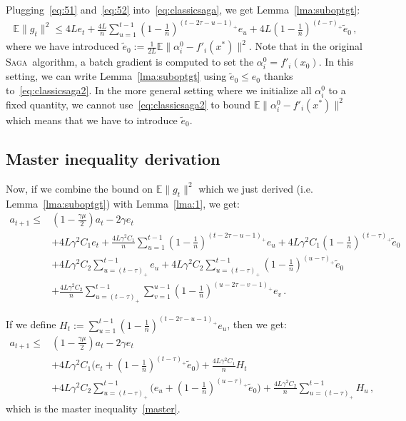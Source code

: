 \documentclass[twoside]{article}
\newcommand{\stepsize}{\gamma}
\newcommand{\strongconvex}{\mu}
\newcommand{\overlap}{\tau}
\newcommand{\lipschitz}{L}
\newcommand{\E}{\mathbb{E}}
\newcommand{\SAGA}{\textsc{Saga}}
\begin{document}
Plugging~\eqref{eq:51} and~\eqref{eq:52} into~\eqref{eq:classicsaga}, we get Lemma~\ref{lma:suboptgt}:
\begin{align}\label{eq:53}
\E\|g_t\|^2
\leq 4\lipschitz e_t 
	+ \frac{4\lipschitz}{n} \sum_{u=1}^{t-1} (1 - \frac{1}{n})^{(t-2\overlap-u -1)_+} e_u 
	+ 4\lipschitz (1 - \frac{1}{n})^{(t-\overlap)_+} \tilde e_0 \,  ,
\end{align}
where we have introduced $\tilde e_0 := \frac{1}{2\lipschitz} \E\|\alpha_i^0 - f'_i(x^*)\|^2$.
Note that in the original \SAGA\ algorithm, a batch gradient is computed to set the $\alpha_i^0 = f'_i(x_0)$. 
In this setting, we can write Lemma~\ref{lma:suboptgt} using $\tilde e_0 \leq e_0$ thanks to~\eqref{eq:classicsaga2}.
In the more general setting where we initialize all $\alpha_i^0$ to a fixed quantity, we cannot use~\eqref{eq:classicsaga2} to bound $\E\|\alpha_i^0 - f'_i(x^*)\|^2$ which means that we have to introduce $\tilde e_0$.

\subsection{Master inequality derivation}\label{apxB:master}
Now, if we combine the bound on $\E\|g_{t}\|^2$ which we just derived (i.e. Lemma~\ref{lma:suboptgt}) with Lemma~\ref{lma:1}, we get:
\begin{equation}
\begin{aligned}
a_{t+1} 
\leq &(1 - \frac{\stepsize\strongconvex}{2}) a_t 
	- 2\stepsize e_t
\\
	&+ 4\lipschitz\stepsize^2 C_1e_t 
	+ \frac{4\lipschitz\stepsize^2 C_1}{n} \sum_{u=1}^{t-1} (1 - \frac{1}{n})^{(t-2\overlap-u -1)_+} e_u
	+ 4\lipschitz \stepsize^2 C_1(1 - \frac{1}{n})^{(t-\overlap)_+} \tilde e_0
\\
	&+4\lipschitz\stepsize^2 C_2\sum_{u=(t-\overlap)_+}^{t-1} e_u 
	+4\lipschitz\stepsize^2 C_2 \sum_{u=(t-\overlap)_+}^{t-1} (1 - \frac{1}{n})^{(u - \overlap)_+} \tilde e_0
\\
	&+ \frac{4\lipschitz\stepsize^2 C_2}{n} \sum_{u=(t-\overlap)_+}^{t-1} \sum_{v=1}^{u-1} (1-\frac{1}{n})^{(u - 2\overlap - v -1)_+}e_v  \, .
\end{aligned}
\end{equation}

If we define $H_t := \sum_{u=1}^{t-1} (1 - \frac{1}{n})^{(t-2\overlap-u-1)_+} e_u$, then we get:
\begin{equation}\label{eq:master}
\begin{aligned} 
a_{t+1} 
\leq &(1 - \frac{\stepsize\strongconvex}{2}) a_t 
	- 2\stepsize e_t
\\
	&+ 4\lipschitz\stepsize^2 C_1 \big(e_t  + (1 - \frac{1}{n})^{(t-\overlap)_+} \tilde e_0 \big)
	+ \frac{4\lipschitz\stepsize^2 C_1}{n} H_t
\\
	&+4\lipschitz\stepsize^2 C_2\sum_{u=(t-\overlap)_+}^{t-1} (e_u +  (1 - \frac{1}{n})^{(u - \overlap)_+} \tilde e_0 \big)
	+\frac{4\lipschitz\stepsize^2 C_2}{n} \sum_{u=(t-\overlap)_+}^{t-1} H_u  \, ,
\end{aligned}
\end{equation}
which is the master inequality~\eqref{master}.
\end{document}
